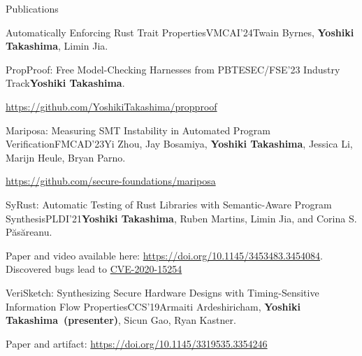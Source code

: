 \documentclass{resume} %
\begin{document}
\begin{rSection}{Publications}

  \begin{rPubsection}{Automatically Enforcing Rust Trait
      Properties}{VMCAI'24}{Twain Byrnes, \textbf{Yoshiki Takashima}, Limin
      Jia.}{}
  \end{rPubsection}

  \begin{rPubsection}{PropProof: Free Model-Checking Harnesses from
      PBT}{ESEC/FSE’23 Industry Track}{\textbf{Yoshiki Takashima}.}{}

    {\footnotesize
      \href{https://github.com/YoshikiTakashima/propproof}
      {https://github.com/YoshikiTakashima/propproof}}
  \end{rPubsection}

  \begin{rPubsection}{Mariposa: Measuring SMT Instability in Automated
      Program Verification}{FMCAD'23}{Yi Zhou, Jay Bosamiya, \textbf{Yoshiki
      Takashima}, Jessica Li, Marijn Heule, Bryan Parno.}{}

    {\footnotesize
      \href{https://github.com/secure-foundations/mariposa}
      {https://github.com/secure-foundations/mariposa}}
  \end{rPubsection}

  \begin{rPubsection}{SyRust: Automatic Testing of Rust Libraries with
      Semantic-Aware Program Synthesis}{PLDI'21}{\textbf{Yoshiki Takashima},
      Ruben Martins, Limin Jia, and Corina S. P\u{a}s\u{a}reanu.}{}

    {\footnotesize Paper and video available here:
      \href{https://doi.org/10.1145/3453483.3454084}
      {https://doi.org/10.1145/3453483.3454084}. Discovered bugs lead
      to
      \href{https://nvd.nist.gov/vuln/detail/CVE-2020-15254}{CVE-2020-15254}}
  \end{rPubsection}

  \begin{rPubsection}{VeriSketch: Synthesizing Secure Hardware Designs
      with Timing-Sensitive Information Flow
      Properties}{CCS'19}{Armaiti Ardeshiricham, \textbf{Yoshiki
        Takashima~(presenter)}, Sicun Gao, Ryan Kastner.}{}

    {\footnotesize Paper and artifact:
      \href{https://dl.acm.org/doi/abs/10.1145/3319535.3354246}
      {https://doi.org/10.1145/3319535.3354246}}
  \end{rPubsection}
\end{rSection}
\end{document}
